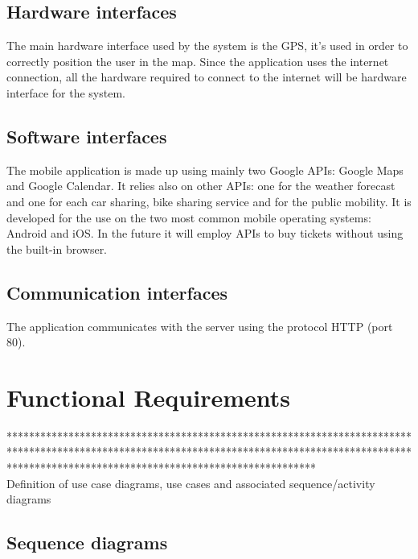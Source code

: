 \subsection{Hardware interfaces}
The main hardware interface used by the system is the GPS, it's used in order to correctly position the user in the map. Since the application uses the internet connection, all the hardware required to connect to the internet will be hardware interface for the system.
%
\subsection{Software interfaces}
The mobile application is made up using mainly two Google APIs: Google Maps and Google Calendar. It relies also on other APIs: one for the weather forecast and one for each car sharing, bike sharing service and for the public mobility.
It is developed for the use on the two most common mobile operating systems: Android and iOS.
In the future it will employ APIs to buy tickets without using the built-in browser.
%
\subsection{Communication interfaces}
The application communicates with the server using the protocol HTTP (port 80).
\section{Functional Requirements}
******************************************************************************************************************************************************************************************************* \\
Definition of use case diagrams, use cases and associated sequence/activity diagrams
\subsection*{Sequence diagrams}

